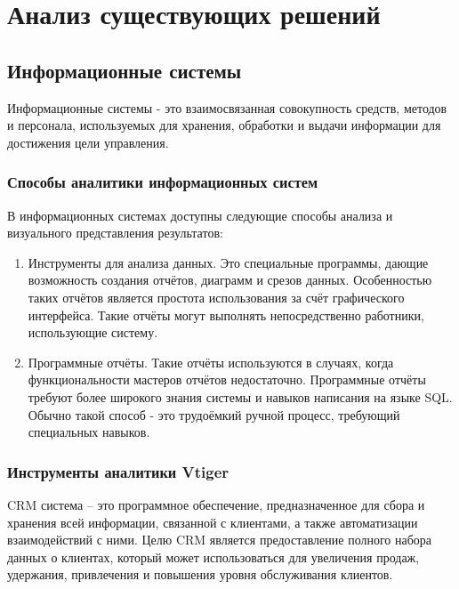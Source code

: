 \chapter{Анализ существующих решений}

\section{Информационные системы}

Информационные системы - это взаимосвязанная совокупность средств, методов и персонала, используемых для хранения, обработки и выдачи информации для достижения цели управления. 

\subsection{Способы аналитики информационных систем}

В информационных системах доступны следующие способы анализа и визуального представления результатов:

\begin{enumerate}
	\item Инструменты для анализа данных. Это специальные программы, дающие возможность создания отчётов, диаграмм и срезов данных. Особенностью таких отчётов является простота использования за счёт графического интерфейса. Такие отчёты могут выполнять непосредственно работники, использующие систему.
	
	\item Программные отчёты. Такие отчёты используются в случаях, когда функциональности мастеров отчётов недостаточно. Программные отчёты требуют более широкого знания системы и навыков написания на языке SQL. Обычно такой способ - это трудоёмкий ручной процесс, требующий специальных навыков. 
\end{enumerate}

\subsection{Инструменты аналитики Vtiger}

CRM система – это программное обеспечение, предназначенное для сбора и хранения всей информации, связанной с клиентами, а также автоматизации взаимодействий с ними. Целю CRM является предоставление полного набора данных о клиентах, который может использоваться для увеличения продаж, удержания, привлечения и повышения уровня обслуживания клиентов.


